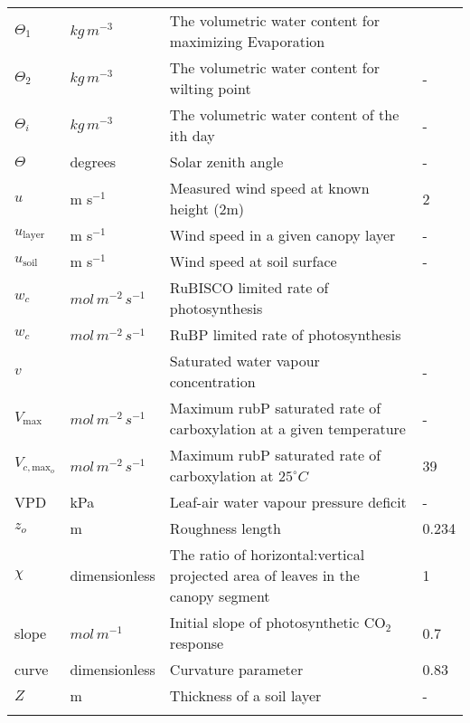 \documentclass[24pt]{report}
\begin{document}
\begin{center}
\begin{longtable}{l l p{3in} p{0.5in}}
$\Theta_1$	&	$kg\, m^{-3}$	&	The volumetric water content for maximizing Evaporation	&		\\
$\Theta_2$	&	$kg\, m^{-3}$	&	The volumetric water content for wilting point	&	-	\\
$\Theta_i$	&	$kg\, m^{-3}$	&	The volumetric water content of the ith day	&	-	\\
$\Theta$	&	degrees	&	Solar zenith angle	&	-	\\
$u$	&	m s$^{-1}$	&	Measured wind speed at known height (2m)	&	2	\\
$u_{\text{layer}}$	&	m s$^{-1}$ 	&	Wind speed in a given canopy layer	&	-	\\
$u_{\text{soil}}$	&	m s$^{-1}$ 	&	Wind speed at soil surface	&	-	\\
$w_c$ & 	$mol\, m^{-2}\, s^{-1}$\marginnote{units?} & RuBISCO limited rate of photosynthesis & \\
$w_c$ & 	$mol\, m^{-2}\, s^{-1}$\marginnote{units?} & RuBP limited rate of photosynthesis & \\

$v$	&		&	Saturated water vapour concentration 	&	-	\\
$V_{\text{max}}$	&	$mol\, m^{-2}\, s^{-1}$ 	&	Maximum rubP saturated rate of carboxylation at a given temperature	&	-	\\
$V_{c,\text{max}_o}$	&	$mol\, m^{-2}\, s^{-1}$ 	&	Maximum rubP saturated rate of carboxylation at $25^\circ C$	&	39	\\
VPD	&	kPa	&	Leaf-air water vapour pressure deficit	&	-	\\
$z_o$	&	m	&	Roughness length	&	0.234	\\
$\chi$	&	dimensionless	&	The ratio of horizontal:vertical projected area of leaves in the canopy segment	&	1	\\
slope	&	$mol\, m^{-1}$ 	&	Initial slope of photosynthetic CO$_2$ response	&	0.7	\\
curve	&	dimensionless	&	Curvature parameter	&	0.83	\\
$Z$	&	m	&	Thickness of a soil layer	&	-	\\
\\
\end{longtable}
\end{center}
\end{document}

